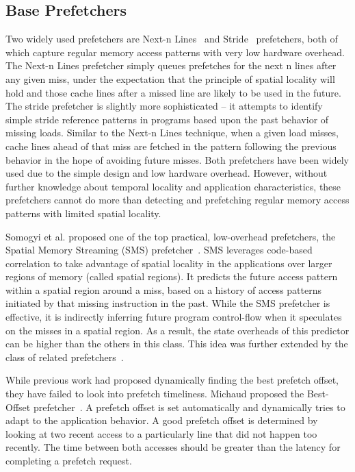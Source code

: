 \subsection{Base Prefetchers}

Two widely used prefetchers are Next-n Lines~\cite{nextn} and Stride~\cite{stride}
prefetchers, both of which capture regular memory access patterns with very low hardware overhead. 
The Next-n Lines prefetcher simply queues prefetches for the next n lines after any given miss, 
under the expectation that the principle of spatial locality will hold and those cache lines after 
a missed line are likely to be used in the future. The stride prefetcher is slightly more 
sophisticated -- it attempts to identify simple stride reference patterns in programs based 
upon the past behavior of missing loads. Similar to the Next-n Lines technique, 
when a given load misses, cache lines ahead of that miss are fetched in the pattern 
following the previous behavior in the hope of avoiding future misses. Both prefetchers 
have been widely used due to the simple design and low hardware overhead. However, 
without further knowledge about temporal locality and application characteristics, 
these prefetchers cannot do more than detecting and prefetching regular memory access 
patterns with limited spatial locality.

Somogyi et al. proposed one of the top practical, low-overhead prefetchers, the Spatial 
Memory Streaming (SMS) prefetcher~\cite{SMS}. SMS leverages code-based correlation 
to take advantage of spatial locality in the applications over larger regions of memory 
(called spatial regions). It predicts the future access pattern within a spatial 
region around a miss, based on a history of access patterns initiated by that 
missing instruction in the past. While the SMS prefetcher is effective, it is 
indirectly inferring future program control-flow when it speculates on the misses 
in a spatial region. As a result, the state overheads of this predictor can 
be higher than the others in this class. This idea was further extended by 
the class of related prefetchers~\cite{STMS,Temporal_Instruction_Fetch}.

While previous work had proposed dynamically finding the best prefetch offset, they have failed to 
look into prefetch timeliness. Michaud proposed the Best-Offset prefetcher~\cite{BOP}. 
A prefetch offset is set automatically and dynamically tries to adapt to the application behavior. 
A good prefetch offset is determined by looking at two recent access to a particularly line 
that did not happen too recently. The time between both accesses should be 
greater than the latency for completing a prefetch request. 

